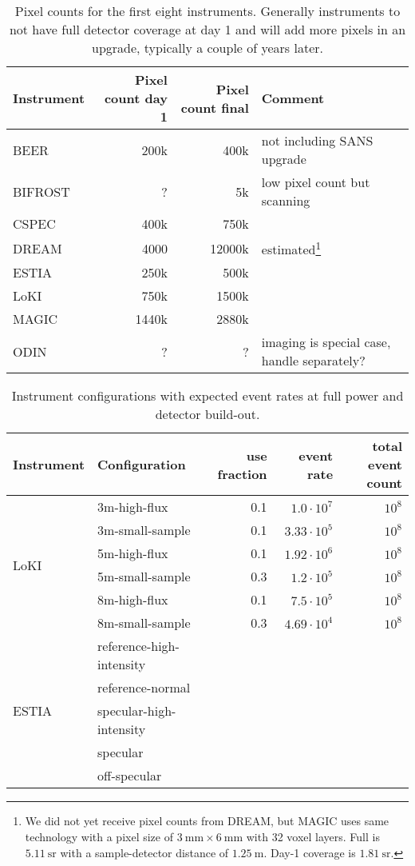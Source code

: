 \documentclass[a4paper,english,numbers=noenddot,bibliography=totoc,chapterprefix=on,DIV=12]{scrartcl}
\newcommand{\beer}{BEER}
\newcommand{\bifrost}{BIFROST}
\newcommand{\cspec}{CSPEC}
\newcommand{\dream}{DREAM}
\newcommand{\estia}{ESTIA}
\newcommand{\loki}{LoKI}
\newcommand{\magic}{MAGIC}
\newcommand{\odin}{ODIN}
\begin{document}
\begin{table}
  \centering
  \begin{tabular}{lrrl}
    Instrument & Pixel count day 1 & Pixel count final & Comment\\
    \hline
    \beer & 200k & 400k & not including SANS upgrade\\
    \bifrost & ? & 5k & low pixel count but scanning\\
    \cspec & 400k & 750k \\
    \dream & 4000 & 12000k & estimated\footnote{We did not yet receive pixel counts from DREAM, but MAGIC uses same technology with a pixel size of $3~\mathrm{mm} \times 6~\mathrm{mm}$ with 32 voxel layers. Full is $5.11~\mathrm{sr}$ with a sample-detector distance of $1.25~\mathrm{m}$. Day-1 coverage is $1.81~\mathrm{sr}$.}\\
    \estia & 250k & 500k \\
    \loki & 750k & 1500k \\
    \magic & 1440k & 2880k \\
    \odin & ? & ? & imaging is special case, handle separately?\\
  \end{tabular}
  \caption{\label{tab:pixel-counts}Pixel counts for the first eight instruments. Generally instruments to not have full detector coverage at day 1 and will add more pixels in an upgrade, typically a couple of years later.}
\end{table}

\begin{table}
  \centering
  \begin{tabular}{llrrr}
    Instrument & Configuration & use fraction & event rate & total event count \\
    \hline
    \hline
    \multirow{6}{*}{\loki}
    & 3m-high-flux    & 0.1 & $1.0\cdot10^7$ & $10^8$ \\
    & 3m-small-sample & 0.1 & $3.33\cdot10^5$ & $10^8$ \\
    & 5m-high-flux    & 0.1 & $1.92\cdot10^6$ & $10^8$ \\
    & 5m-small-sample & 0.3 & $1.2\cdot10^5$ & $10^8$ \\
    & 8m-high-flux    & 0.1 & $7.5\cdot10^5$ & $10^8$ \\
    & 8m-small-sample & 0.3 & $4.69\cdot10^4$ & $10^8$ \\
    \hline
    \multirow{5}{*}{\estia} & reference-high-intensity\\ & reference-normal\\ & specular-high-intensity\\ & specular\\ & off-specular\\
  \end{tabular}
  \caption{\label{tab:configurations}Instrument configurations with expected event rates at full power and detector build-out.}
\end{table}
\end{document}
